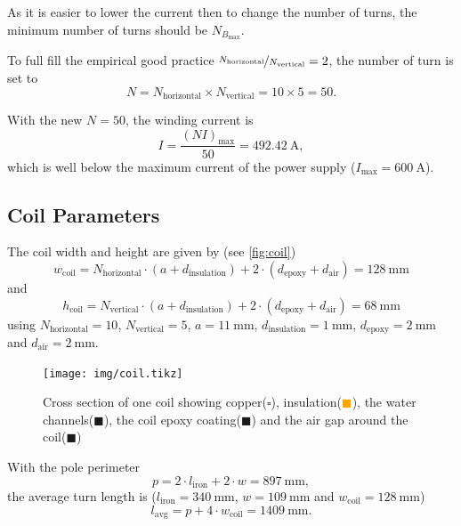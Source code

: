 \documentclass[10pt,a4paper,noendnumber=true]{scrartcl}
\begin{document}
As it is easier to lower the current then to change the number of turns, the minimum number of turns should be $N_{B_\text{max}}$.

To full fill the empirical good practice $\nicefrac{N_\text{horizontal}}{N_\text{vertical}}=2$, the number of turn is set to
\begin{equation}
    N=N_\text{horizontal} \times N_\text{vertical} = 10 \times 5 = 50.
\end{equation}

With the new $N=50$, the winding current is
\begin{equation}
    I = \frac{(NI)_\text{max}}{50} = \SI{492.42}{\ampere},
\end{equation}
which is well below the maximum current of the power supply ($I_\text{max}=\SI{600}{\ampere}$).

\subsection{Coil Parameters}
The coil width and height are given by (see \autoref{fig:coil})
\begin{equation}
    w_\text{coil}=N_\text{horizontal} \cdot (a+d_\text{insulation}) + 2\cdot(d_\text{epoxy} + d_\text{air}) = \SI{128}{\mm}
\end{equation}
and
\begin{equation}
    h_\text{coil}=N_\text{vertical} \cdot (a+d_\text{insulation}) + 2\cdot(d_\text{epoxy} + d_\text{air}) = \SI{68}{\mm}
\end{equation}
using $N_\text{horizontal}=10$, $N_\text{vertical}=5$, $a=\SI{11}{\mm}$, $d_\text{insulation}=\SI{1}{\mm}$, $d_\text{epoxy}=\SI{2}{\mm}$ and $d_\text{air}=\SI{2}{\mm}$.

\begin{figure}[H]
\centering
\texttt{[image: img/coil.tikz]}
\caption{Cross section of one coil showing copper(\textcolor{black}{$\square$}), insulation(\textcolor{orange}{$\blacksquare$}), 
the water channels(\textcolor{blue!30}{$\blacksquare$}),
the coil epoxy coating(\textcolor{red!30}{$\blacksquare$}) and
the air gap around the coil(\textcolor{green!30}{$\blacksquare$})}
\label{fig:coil}
\end{figure}

With the pole perimeter
\begin{equation}
	p = 2 \cdot l_\text{iron} + 2 \cdot w = \SI{897}{\mm},
\end{equation}
the average turn length is ($l_\text{iron} = \SI{340}{\mm}$, $w = \SI{109}{\mm}$ and $w_\text{coil} = \SI{128}{\mm}$)
\begin{equation}
    l_\text{avg}= p + 4 \cdot w_\text{coil} = \SI{1409}{\mm}.
\end{equation}
\end{document}
